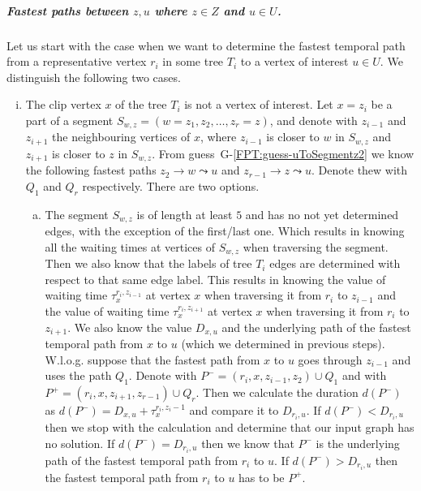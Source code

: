 \documentclass[a4paper,UKenglish,cleveref, autoref, thm-restate]{lipics-v2021}
\begin{document}
\subparagraph{\boldmath Fastest paths between $z,u$ where $z \in Z$ and $u \in U$.}
Let us start with the case when we want to determine the fastest temporal path from a representative vertex $r_i$ in some tree $T_i$ to a vertex of interest $u \in U$.
We distinguish the following two cases.
\begin{enumerate}[(i)]
    \item \label{FPT:z-u-clipnotU}
    The clip vertex $x$ of the tree $T_i$ is not a vertex of interest.
    Let $x = z_i$ be a part of a segment $S_{w,z} = (w = z_1, z_2, \dots, z_r = z)$, and denote with $z_{i-1}$ and $z_{i+1}$ the neighbouring vertices of $x$, 
    where $z_{i-1}$ is closer to $w$ in $S_{w,z}$ and 
    $z_{i+1}$ is closer to $z$ in $S_{w,z}$.
    From guess~G-\ref{FPT:guess-uToSegmentz2} we know the following fastest paths $z_{2} \rightarrow w \leadsto u$ and %
    $z_{r-1} \rightarrow z \leadsto u$.
    Denote thew with $Q_1$ and $Q_r$ respectively.
    There are two options.
    \begin{enumerate}[(a)]
        \item The segment $S_{w,z}$ is of length at least $5$ and has no not yet determined edges, with the exception of the first/last one.
        Which results in knowing all the waiting times at vertices of $S_{w,z}$ when traversing the segment.
        Then we also know that the labels of tree $T_i$ edges are determined with respect to that same edge label.
        This results in knowing the value of waiting time
        $\tau_x^{r_i,z_{i-1}}$ at vertex $x$ when traversing it from $r_i$ to $z_{i-1}$ and 
        the value of waiting time $\tau_x^{r_i,z_{i+1}}$ at vertex $x$
        when traversing it from $r_i$ to $z_{i+1}$.
        We also know the value $D_{x,u}$ and the underlying path of the fastest temporal path from $x$ to $u$ (which we determined in previous steps).
        W.l.o.g. suppose that the fastest path from $x$ to $u$ goes through $z_{i-1}$ and uses the path $Q_1$.
        Denote with $P^{-} = (r_i, x, z_{i-1}, z_2) \cup Q_1$
        and with $P^{+} = (r_i, x, z_{i+1}, z_{r-1}) \cup Q_r$.
        Then we calculate the duration $d(P^{-})$ as $d(P^{-}) = D_{x,u} + \tau_x^{r_i,z_i-1}$
        and compare it to $D_{r_i,u}$.
        If $d(P^{-}) < D_{r_i,u} $ then we stop with the calculation and determine that our input graph has no solution.
        If $d(P^{-}) = D_{r_i,u} $ then we know that $P^{-}$ is the underlying path of the fastest temporal path from $r_i$ to $u$. 
        If $d(P^{-}) > D_{r_i,u} $ then the fastest temporal path from $r_i$ to $u$ has to be $P^{+}$.

\end{enumerate}
\end{enumerate}
\end{document}
